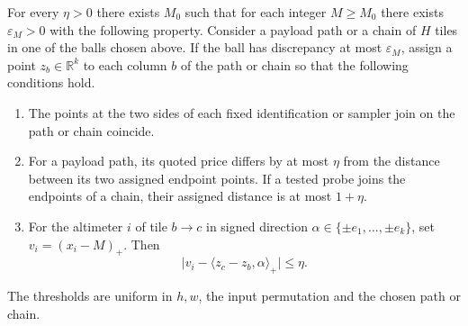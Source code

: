 \begin{lemma}\label{lem:protocol-local}
For every $\eta>0$ there exists $M_0$ such that for each integer
$M\ge M_0$ there exists $\varepsilon_M>0$ with the following property.
Consider a payload path or a chain of $H$ tiles in one of the balls
chosen above. If the ball has discrepancy at most $\varepsilon_M$,
assign a point $z_b\in\mathbb R^k$ to each column $b$ of the path or
chain so that the following conditions hold.
\begin{enumerate}
\item The points at the two sides of each fixed identification or
sampler join on the path or chain coincide.
\item For a payload path, its quoted price differs by at most $\eta$
from the distance between its two assigned endpoint points.
If a tested probe joins the endpoints of a chain, their assigned
distance is at most $1+\eta$.
\item For the altimeter $i$ of tile $b\to c$ in signed direction
$\alpha\in\{\pm e_1,\ldots,\pm e_k\}$, set $v_i=(x_i-M)_+$.
Then
\[
 \big|v_i-\langle z_c-z_b,\alpha\rangle_+\big|\le\eta .
\]
\end{enumerate}
The thresholds are uniform in $h,w$, the input permutation and the
chosen path or chain.
\end{lemma}

